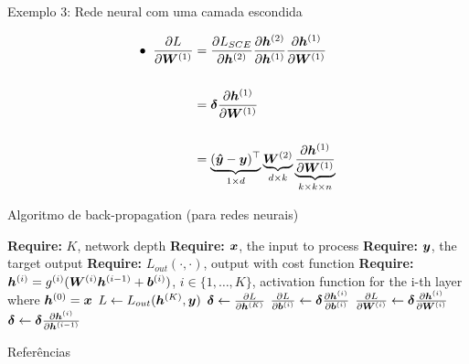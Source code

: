 \documentclass[10pt]{beamer}
\begin{document}
\begin{frame}{Exemplo 3: Rede neural com uma camada escondida}
\Large{

\begin{align*}
\bullet \; \; \frac{\partial L}{\partial \bm{W}^{(1)}}&= \frac{\partial L_{SCE}}{\partial \bm{h}^{(2)}}\frac{\partial \bm{h}^{(2)}}{\partial \bm{h}^{(1)}}\frac{\partial \bm{h}^{(1)}}{\partial \bm{W}^{(1)}}\\
&\\
&= \bm{\delta}\frac{\partial \bm{h}^{(1)}}{\partial \bm{W}^{(1)}}\\
&\\
&= \underbrace{(\bm{\hat{y}} - \bm{y})^{\top}}_{\tiny{1 \times d}} \underbrace{\bm{W}^{(2)}}_{\tiny{d \times k}} \underbrace{\frac{\partial \bm{h}^{(1)}}{\partial \bm{W}^{(1)}}}_{\tiny{k \times k \times n}}\\
\end{align*}
}
\end{frame}

\begin{frame}{Algoritmo de back-propagation (para redes neurais)}
\begin{algorithm}[H]
\begin{algorithmic}[1]
\STATE \textbf{Require:} $K$, network depth
\STATE \textbf{Require:} $\bm{x}$, the input to process
\STATE \textbf{Require:} $\bm{y}$, the target output
\STATE \textbf{Require:} $L_{out}( \cdot ,  \cdot)$, output with cost function
\STATE \textbf{Require:} $\bm{h}^{(i)} = g^{(i)}(\bm{W}^{(i)}\bm{h}^{(i-1)} + \bm{b}^{(i)})$, $i \in \{1, \dots, K\}$, activation function for the i-th layer where $\bm{h}^{(0)} = \bm{x}$
\STATE $L \leftarrow L_{out}(\bm{h}^{(K)}, \bm{y})$
\STATE $\bm{\delta} \leftarrow \frac{\partial L}{\partial \bm{h}^{(K)}}$
\STATE $\frac{\partial L}{\partial \bm{b}^{(i)}} \leftarrow  \bm{\delta}\frac{\partial \bm{h}^{(i)}}{\partial \bm{b}^{(i)}}$
\STATE $\frac{\partial L}{\partial \bm{W}^{(i)}} \leftarrow  \bm{\delta}\frac{\partial \bm{h}^{(i)}}{\partial \bm{W}^{(i)}}$
\STATE $\bm{\delta} \leftarrow \bm{\delta}\frac{\partial \bm{h}^{(i)}}{\partial \bm{h}^{(i-1)}}$
\ENDFOR
\end{algorithmic}
\caption{Back-propagation for a deep neural network}
\label{alg:seq}
\end{algorithm}
\end{frame}


\begin{frame}[allowframebreaks]{Referências}

  
  

\end{frame}
\end{document}
